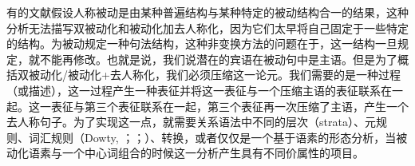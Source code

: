 有的文献假设人称被动是由某种普遍结构与某种特定的被动结构合一的结果，这种分析无法描写双被动化和被动化加去人称化，因为它们太早将自己固定于一些特定的结构。为被动规定一种句法结构，这种非变换方法的问题在于，这一结构一旦规定，就不能再修改。也就是说，我们说潜在的宾语在被动句中是主语。但是为了概括双被动化/被动化+去人称化，我们必须压缩这一论元。我们需要的是一种过程（或描述），这一过程产生一种表征并将这一表征与一个压缩主语的表征联系在一起。这一表征与第三个表征联系在一起，第三个表征再一次压缩了主语，产生一个去人称句子。为了实现这一点，就需要关系语法\citep{Timberlake82a,Ozkaragoez86a}中不同的层次（strata）、元规则\citep*{GKPS85a}、词汇规则（Dowty, \citeyear[]{Dowty78a}；\citeyear[\S~3.4]{Dowty2003a}；\citealt{Bresnan82a,ps,Blevins2003a,Mueller2003e}）、转换\citep{Chomsky57a}，或者仅仅是一个基于语素的形态分析，当被动化语素与一个中心词组合的时候这一分析产生具有不同价属性的项目\citep{Chomsky81a}。

